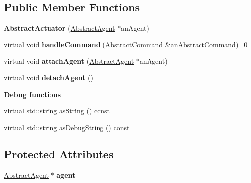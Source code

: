 \subsection*{Public Member Functions}
\begin{DoxyCompactItemize}
\item 
{\bfseries Abstract\+Actuator} (\hyperlink{class_model_1_1_abstract_agent}{Abstract\+Agent} $\ast$an\+Agent)\hypertarget{class_model_1_1_abstract_actuator_a9137214d1e7cdb2939c90a858d451ac9}{}\label{class_model_1_1_abstract_actuator_a9137214d1e7cdb2939c90a858d451ac9}

\item 
virtual void {\bfseries handle\+Command} (\hyperlink{class_model_1_1_abstract_command}{Abstract\+Command} \&an\+Abstract\+Command)=0\hypertarget{class_model_1_1_abstract_actuator_adc357b727d6df7f1b0e0238c85fa99b2}{}\label{class_model_1_1_abstract_actuator_adc357b727d6df7f1b0e0238c85fa99b2}

\item 
virtual void {\bfseries attach\+Agent} (\hyperlink{class_model_1_1_abstract_agent}{Abstract\+Agent} $\ast$an\+Agent)\hypertarget{class_model_1_1_abstract_actuator_a36eb339606068a2dd22c5638628077ea}{}\label{class_model_1_1_abstract_actuator_a36eb339606068a2dd22c5638628077ea}

\item 
virtual void {\bfseries detach\+Agent} ()\hypertarget{class_model_1_1_abstract_actuator_a6499da8f728e56e4bfe6ae3b8601d2ec}{}\label{class_model_1_1_abstract_actuator_a6499da8f728e56e4bfe6ae3b8601d2ec}

\end{DoxyCompactItemize}
\begin{Indent}{\bf Debug functions}\par
\begin{DoxyCompactItemize}
\item 
virtual std\+::string \hyperlink{class_model_1_1_abstract_actuator_a6fe9d0ac0c7c6c56176fff61a773a4b9}{as\+String} () const 
\item 
virtual std\+::string \hyperlink{class_model_1_1_abstract_actuator_ab5199d4458a2913844459832d563f989}{as\+Debug\+String} () const 
\end{DoxyCompactItemize}
\end{Indent}
\subsection*{Protected Attributes}
\begin{DoxyCompactItemize}
\item 
\hyperlink{class_model_1_1_abstract_agent}{Abstract\+Agent} $\ast$ {\bfseries agent}\hypertarget{class_model_1_1_abstract_actuator_ad1067c897d696580dc7bc5713d1357d7}{}\label{class_model_1_1_abstract_actuator_ad1067c897d696580dc7bc5713d1357d7}

\end{DoxyCompactItemize}



